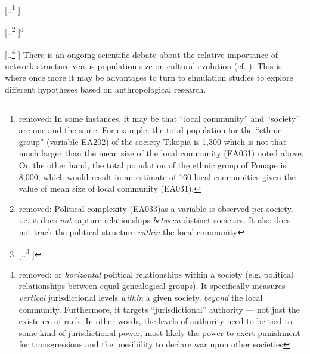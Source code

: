 \documentclass[unnumsec,webpdf,modern,medium]{oup-authoring-template}
\providecommand{\DIFaddtex}[1]{{\protect\color{blue} \sf #1}} %
\providecommand{\DIFdeltex}[1]{{\protect\color{red} [..\footnote{removed: #1} ]}} %
\providecommand{\DIFaddbegin}{} %
\providecommand{\DIFaddend}{} %
\providecommand{\DIFdelbegin}{} %
\providecommand{\DIFdelend}{} %
\providecommand{\DIFadd}[1]{\texorpdfstring{\DIFaddtex{#1}}{#1}} %
\providecommand{\DIFdel}[1]{\texorpdfstring{\DIFdeltex{#1}}{}} %
\newcommand{\DIFscaledelfig}{0.5}
\newlength{\DIFdelgraphicswidth} %
\newlength{\DIFdelgraphicsheight} %
\newcommand{\DIFaddincludegraphics}[2][]{{\color{blue}\fbox{\DIFOincludegraphics[#1]{#2}}}} %
\newcommand{\DIFdelincludegraphics}[2][]{%
\sbox{\DIFdelgraphicsbox}{\DIFOincludegraphics[#1]{#2}}%
\settoboxwidth{\DIFdelgraphicswidth}{\DIFdelgraphicsbox} %
\settoboxtotalheight{\DIFdelgraphicsheight}{\DIFdelgraphicsbox} %
\scalebox{\DIFscaledelfig}{%
\parbox[b]{\DIFdelgraphicswidth}{\usebox{\DIFdelgraphicsbox}\\[-\baselineskip] \rule{\DIFdelgraphicswidth}{0em}}\llap{\resizebox{\DIFdelgraphicswidth}{\DIFdelgraphicsheight}{%
\setlength{\unitlength}{\DIFdelgraphicswidth}%
\begin{picture}(1,1)%
\thicklines\linethickness{2pt} %
{\color[rgb]{1,0,0}\put(0,0){\framebox(1,1){}}}%
{\color[rgb]{1,0,0}\put(0,0){\line( 1,1){1}}}%
{\color[rgb]{1,0,0}\put(0,1){\line(1,-1){1}}}%
\end{picture}%
}\hspace*{3pt}}} %
} %
\DeclareRobustCommand{\DIFaddbegin}{\DIFOaddbegin \let\includegraphics\DIFaddincludegraphics} %
\DeclareRobustCommand{\DIFaddend}{\DIFOaddend \let\includegraphics\DIFOincludegraphics} %
\DeclareRobustCommand{\DIFdelbegin}{\DIFOdelbegin \let\includegraphics\DIFdelincludegraphics} %
\DeclareRobustCommand{\DIFdelend}{\DIFOaddend \let\includegraphics\DIFOincludegraphics} %
\begin{document}
\DIFdelbegin \DIFdel{In some instances, it may be that ``local community'' and ``society'' are one and the same. For example, the total population for the ``ethnic group'' (variable EA202) of the society Tikopia is 1,300 which is not that much larger than the mean size of the local community (EA031) noted above. 
On the other hand, the total population of the ethnic group of Ponape is 8,000, which would result in an estimate of 160 local communities given the value of mean size of local community (EA031). }%

\DIFdel{Political complexity (EA033)as a variable is observed per society, i.e. it does \emph{not} capture relationships \emph{between} distinct societies. It also does not track the political structure \emph{within} the local community}\footnote{\DIFdel{Ethnographic Atlas variable 32 captures jurisdictional hierarchies \emph{within} local communities.}} %
\addtocounter{footnote}{-1}%
\DIFdel{or \emph{horizontal} political relationships within a society (e.g. political relationships between equal genealogical groups). It specifically measures \emph{vertical} jurisdictional levels \emph{within} a given society, \emph{beyond} the local community. Furthermore, it targets ``jurisdictional'' authority --- not just the existence of rank. In other words, the levels of authority need to be tied to some kind of jurisdictional power, most likely the power to exert punishment for transgressions and the possibility to declare war upon other societies}\DIFdelend \DIFaddbegin \DIFadd{There is an ongoing scientific debate about the relative importance of network structure versus population size on cultural evolution (cf. \citet{raviv2019larger, derex2016partial, milroy1992social, reali2014paradox}). This is where once more it may be advantages to turn to simulation studies to explore different hypotheses based on anthropological research}\DIFaddend .
\end{document}
